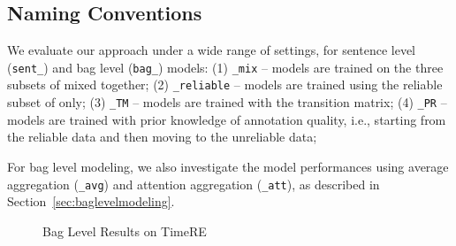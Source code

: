 \subsection{Naming Conventions}
We evaluate our approach under a wide range of settings, for  
 sentence level
(\texttt{sent\_}) and bag level (\texttt{bag\_}) models: 
(1) \texttt{\_mix} -- models are trained on the three subsets of \TimeRE mixed together;
(2) \texttt{\_reliable} -- models are trained using the reliable subset of \TimeRE only;
(3) \texttt{\_TM} -- models are trained with the transition matrix;
(4) \texttt{\_PR} -- models are trained with prior knowledge of annotation quality, i.e., starting from the reliable data and then moving to the unreliable data;

For bag level modeling, we also investigate the model performances using average aggregation (\texttt{\_avg})
and attention aggregation (\texttt{\_att}), as described in Section~\ref{sec:baglevelmodeling}.

\begin{figure}[htbp]
\centering
{}
\caption{Bag Level Results on TimeRE}
\label{fig: results_on_luo}
\end{figure}

